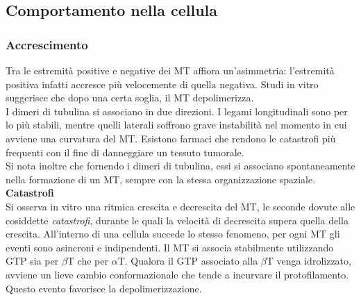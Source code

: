     \subsection{Comportamento nella cellula}
        \subsubsection{Accrescimento}
            Tra le estremità positive e negative dei MT affiora un'asimmetria: l'estremità positiva infatti accresce più velocemente di quella negativa. Studi in vitro suggerisce che dopo una certa soglia, il MT depolimerizza.\\
            I dimeri di tubulina si associano in due direzioni. I legami longitudinali sono per lo più stabili, mentre quelli laterali soffrono grave instabilità nel momento in cui avviene una curvatura del MT. Esistono farmaci che rendono le catastrofi più frequenti con il fine di danneggiare un tessuto tumorale.\\
            Si nota inoltre che fornendo i dimeri di tubulina, essi si associano spontaneamente nella formazione di un MT, sempre con la stessa organizzazione spaziale.\\
            
            \textbf{Catastrofi}\\
                Si osserva in vitro una ritmica crescita e decrescita del MT, le seconde dovute alle cosiddette \textit{catastrofi}, durante le quali la velocità di decrescita supera quella della crescita.
                All'interno di una cellula succede lo stesso fenomeno, per ogni MT gli eventi sono asincroni e indipendenti.
                Il MT si associa stabilmente utilizzando GTP sia per $\beta$T che per $\alpha$T. Qualora il GTP associato alla $\beta$T venga idrolizzato, avviene un lieve cambio conformazionale che tende a incurvare il protofilamento. Questo evento favorisce la depolimerizzazione.\\
                
